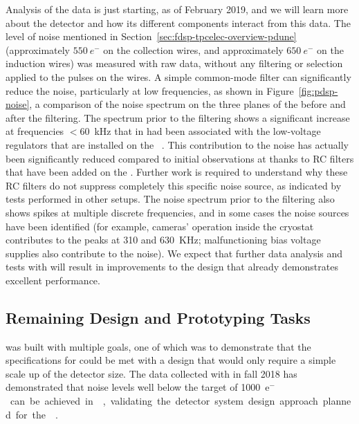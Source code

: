 Analysis of the  data is just starting, as of February 2019, and 
we will learn more about the detector and how its different components interact
from this data. The level of noise mentioned in Section~\ref{sec:fdsp-tpcelec-overview-pdune}
(approximately $\SI{550}{e^-}$ on the collection wires,
and approximately $\SI{650}{e^-}$ on the induction wires) 
was measured with raw data, without any
filtering or selection applied to the pulses on the 
wires. A simple common-mode filter can significantly reduce the 
noise, particularly at low frequencies, as shown in Figure~\ref{fig:pdsp-noise},  
a comparison of the noise spectrum on the three planes of the  
before and after the filtering. The spectrum prior to the filtering shows 
a significant increase at frequencies $<$\SI{60}{kHz} that in  
had been associated with the low-voltage regulators that are installed
on the ~\cite{Acciarri:2017sde}. This contribution to the noise 
has actually been significantly reduced compared to initial observations at 
 thanks to RC filters that have been added
on the  . Further work is required to
understand why these RC filters do not suppress completely this
specific noise source, as indicated by tests performed in other setups.
The noise spectrum prior to the filtering also shows spikes at multiple 
discrete frequencies, and in some cases the noise sources have been 
identified (for example, cameras' operation inside the cryostat
contributes to the peaks at \num{310} and \SI{630}{KHz};
malfunctioning bias voltage supplies also contribute to the noise). We 
expect that further data analysis and tests with  
will result in improvements to the  design that 
already demonstrates excellent performance.

\subsection{Remaining Design and Prototyping Tasks}
\label{sec:fdsp-tpcelec-overview-remaining}

  was %
 built with multiple
goals, one of which was to demonstrate that the specifications
for  could be met with a design that would only require a simple
scale up of the detector size. The data collected with 
in fall 2018 has demonstrated that noise levels well below the target
of \SI{1000}{e$^-$} can be achieved in \lar, validating the
detector system design approach planned for the  .

